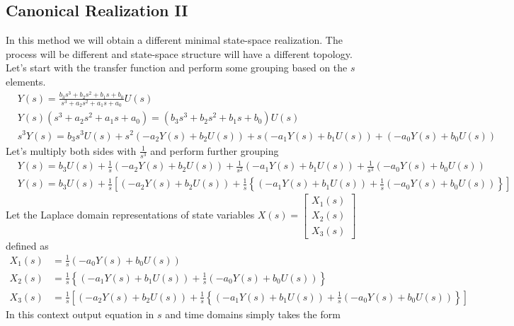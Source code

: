 \documentclass[twoside]{article}
\begin{document}
\subsection{Canonical Realization II}

In this method we will obtain a different minimal state-space realization. 
The process will be different and state-space structure will have a
different topology. Let's start with the transfer function 
and perform some grouping based on the $s$ elements.
%
\begin{align*}
&Y(s) = \frac{ b_3 s^3 + b_2 s^2  + b_1 s + b_0 }{ s^3 + a_2 s^2 + a_1 s + a_0} U(s)
\\
&Y(s) \left( s^3 + a_2 s^2 + a_1 s + a_0 \right) = \left( b_3 s^3 + b_2 s^2  + b_1 s + b_0 \right) U(s)
\\
&s^3 Y(s) = b_3 s^3 U(s) + s^2 \left( -a_2 Y(s) + b_2 U(s) \right) + s \left( -a_1 Y(s) + b_1 U(s) \right) + 
\left( -a_0 Y(s) + b_0 U(s) \right) 
\end{align*}
%
Let's multiply both sides with $\frac{1}{s^3}$ and perform further grouping
%
\begin{align*}
&Y(s) = b_3 U(s) + \frac{1}{s} \left( -a_2 Y(s) + b_2 U(s) \right) + \frac{1}{s^2}  \left( -a_1 Y(s) + b_1 U(s) \right) + 
\frac{1}{s^3} \left( -a_0 Y(s) + b_0 U(s) \right) 
\\
&Y(s) = b_3 U(s) + \frac{1}{s} \left[ \left( -a_2 Y(s) + b_2 U(s) \right) + \frac{1}{s}  \left\lbrace \left( -a_1 Y(s) + b_1 U(s) \right) + 
\frac{1}{s} \left( -a_0 Y(s) + b_0 U(s) \right) \right\rbrace \right]
\end{align*}
%
Let the Laplace domain representations of state variables $X(s) = \left[ \begin{array}{c} X_1(s) \\ X_2(s) \\ X_3(s) \end{array} \right]$ defined as 
%
\begin{align*}
X_1(s) &= \frac{1}{s} \left( -a_0 Y(s) + b_0 U(s) \right)
\\
X_2(s) &= \frac{1}{s}  \left\lbrace \left( -a_1 Y(s) + b_1 U(s) \right) + 
\frac{1}{s} \left( -a_0 Y(s) + b_0 U(s) \right) \right\rbrace
\\
X_3(s) &= \frac{1}{s} \left[ \left( -a_2 Y(s) + b_2 U(s) \right) + \frac{1}{s}  \left\lbrace \left( -a_1 Y(s) + b_1 U(s) \right) + 
\frac{1}{s} \left( -a_0 Y(s) + b_0 U(s) \right) \right\rbrace \right]
\end{align*}
%
In this context output equation in $s$ and time domains simply takes the form
\end{document}
